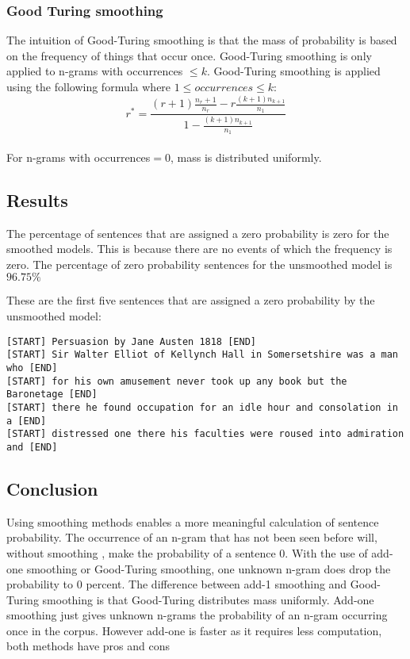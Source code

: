 \documentclass[a4paper, 10pt]{article}
\begin{document}
\subsubsection*{Good Turing smoothing}
The intuition of Good-Turing smoothing is that the mass of probability is based on the frequency of things that occur once. Good-Turing smoothing is only applied to n-grams with occurrences $\leq k$. Good-Turing smoothing is applied using the following formula where $1 \leq occurrences \leq k$:\\
$$
r^*=\frac{(r+1)\frac{n_r+1}{n_r}-r\frac{(k+1)n_{k+1}}{n_1}}{1-\frac{(k+1)n_{k+1}}{n_1}}
$$\\
For n-grams with occurrences$ = 0$, mass is distributed uniformly.

\subsection*{Results}  
The percentage of sentences that are assigned a zero probability is zero for the smoothed models. This is because there are no events of which the frequency is zero. The percentage of zero probability sentences for the unsmoothed model is $96.75\%$            

These are the first five sentences that are assigned a zero probability by the unsmoothed model: 

\begin{lstlisting}[breaklines] 
[START] Persuasion by Jane Austen 1818 [END]
[START] Sir Walter Elliot of Kellynch Hall in Somersetshire was a man who [END]
[START] for his own amusement never took up any book but the Baronetage [END]
[START] there he found occupation for an idle hour and consolation in a [END]
[START] distressed one there his faculties were roused into admiration and [END]
\end{lstlisting}


\subsection*{Conclusion}
Using smoothing methods enables a more meaningful calculation of sentence probability. The occurrence of an n-gram that has not been seen before will, without smoothing , make the probability of a sentence $0$. With the use of add-one smoothing or Good-Turing smoothing, one unknown n-gram does drop the probability to $0$ percent. The difference between add-1 smoothing and Good-Turing smoothing is that Good-Turing distributes mass uniformly. Add-one smoothing just gives unknown n-grams the probability of an n-gram occurring once in the corpus. However add-one is faster as it requires less computation, both methods have pros and cons 
\end{document}
